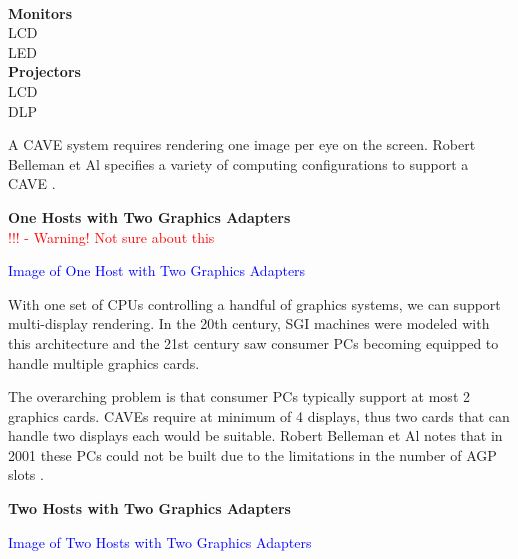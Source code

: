 \label{chapter:standardCAVEChapter}


\filbreak
{} \\

\filbreak
\noindent\textbf{Monitors}\\

\filbreak
\noindent LCD\\

\filbreak
\noindent LED\\

\filbreak
\noindent\textbf{Projectors}\\


\filbreak
\noindent LCD\\


\filbreak
\noindent DLP\\


\filbreak
{}

A CAVE system requires rendering one image per eye on the screen. Robert Belleman et Al specifies a variety of computing configurations to support a CAVE \cite{belleman}.

\filbreak
\noindent\textbf{One Hosts with Two Graphics Adapters}\\
\textcolor{red}{!!! - Warning! Not sure about this}
\begin{center}
	\textcolor{blue}{Image of One Host with Two Graphics Adapters}
\end{center}

With one set of CPUs controlling a handful of graphics systems, we can support multi-display rendering. In the 20th century, SGI machines were modeled with this architecture and the  21st century saw consumer PCs becoming equipped to handle multiple graphics cards. 

The overarching problem is that consumer PCs typically support at most 2 graphics cards. CAVEs require at minimum of 4 displays, thus two cards that can handle two displays each would be suitable. Robert Belleman et Al notes that in 2001 these PCs could not be built due to the limitations in the number of AGP slots \cite{belleman}.

\filbreak
\noindent\textbf{Two Hosts with Two Graphics Adapters}\\
\begin{center}
	\textcolor{blue}{Image of Two Hosts with Two Graphics Adapters}
\end{center}

